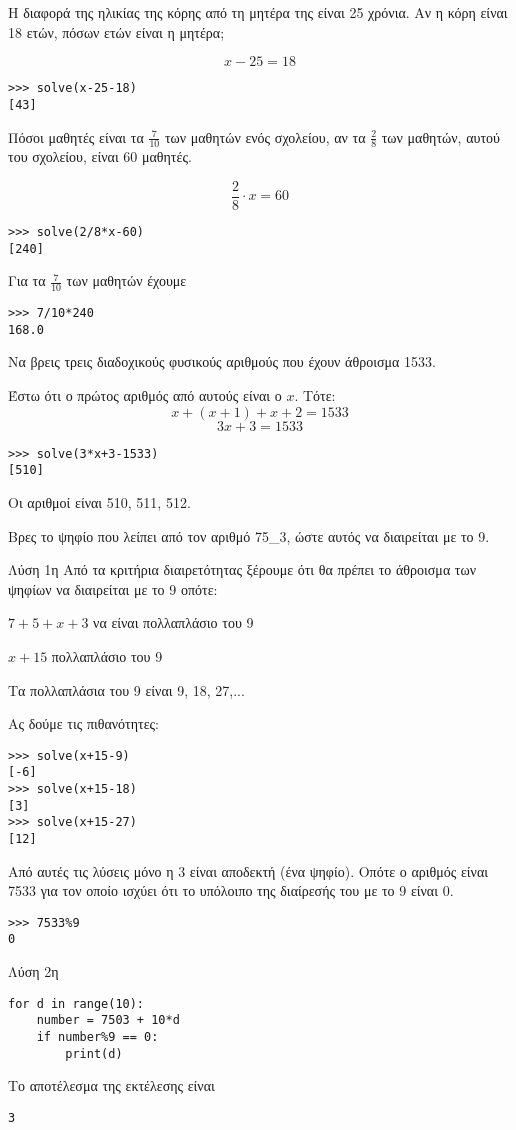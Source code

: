 \begin{exercise}
Η διαφορά της ηλικίας της κόρης από τη μητέρα της είναι 25 χρόνια.
Αν η κόρη είναι 18 ετών, πόσων ετών είναι η μητέρα;
\end{exercise}
$$x-25 = 18$$
\begin{lstlisting}
>>> solve(x-25-18)
[43]
\end{lstlisting}
\begin{exercise}
Πόσοι μαθητές είναι τα $\frac{7}{10}$ των μαθητών ενός σχολείου, αν τα $\frac{2}{8}$ των
μαθητών, αυτού του σχολείου, είναι $60$ μαθητές.
\end{exercise}
$$\frac{2}{8}\cdot x  =60$$
\begin{lstlisting}
>>> solve(2/8*x-60)
[240]
\end{lstlisting}
Για τα $\frac{7}{10}$ των μαθητών έχουμε
\begin{lstlisting}
>>> 7/10*240
168.0
\end{lstlisting}
\begin{exercise}
Να βρεις τρεις διαδοχικούς φυσικούς αριθμούς που έχουν άθροισμα 1533.
\end{exercise}
Έστω ότι ο πρώτος αριθμός από αυτούς είναι ο $x$. Τότε:
$$x+(x+1)+x+2 = 1533$$
$$3x+3 = 1533$$
\begin{lstlisting}
>>> solve(3*x+3-1533)
[510]
\end{lstlisting}
Οι αριθμοί είναι 510, 511, 512.
\begin{exercise}
Βρες το ψηφίο που λείπει από τον αριθμό 75\_3, ώστε αυτός να διαιρείται με το 9.
\end{exercise}
Λύση 1η
Από τα κριτήρια διαιρετότητας ξέρουμε ότι θα πρέπει το άθροισμα των ψηφίων να διαιρείται με το 9 οπότε:

$7+5+x+3$ να είναι πολλαπλάσιο του 9

$x+15$ πολλαπλάσιο του 9 

Τα πολλαπλάσια του 9 είναι 9, 18, 27,...

Ας δούμε τις πιθανότητες:

\begin{lstlisting}
>>> solve(x+15-9)
[-6]
>>> solve(x+15-18)
[3]
>>> solve(x+15-27)
[12]
\end{lstlisting}
Από αυτές τις λύσεις μόνο η 3 είναι αποδεκτή (ένα ψηφίο). Οπότε ο αριθμός είναι 7533 για τον οποίο ισχύει ότι το υπόλοιπο της διαίρεσής του με το 9 είναι 0.
\begin{lstlisting}
>>> 7533%9
0
\end{lstlisting}
Λύση 2η
\begin{lstlisting}
for d in range(10):
    number = 7503 + 10*d
    if number%9 == 0:
        print(d)
\end{lstlisting}
Το αποτέλεσμα της εκτέλεσης είναι
\begin{lstlisting}
3
\end{lstlisting}

